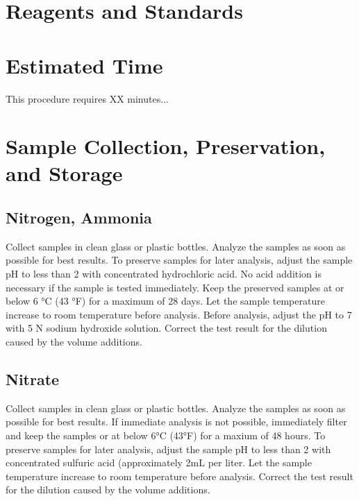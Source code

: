 \documentclass[12pt]{../SOP4_alpha}\usepackage[]{graphicx}\usepackage[]{xcolor}
\begin{document}
\section{Reagents and Standards}

\section{Estimated Time}

\NP This procedure requires XX minutes...

\section{Sample Collection, Preservation, and Storage}
\subsection{Nitrogen, Ammonia}
\NP Collect samples in clean glass or plastic bottles.
\NP Analyze the samples as soon as possible for best results.
\NP To preserve samples for later analysis, adjust the sample pH to less than 2 with concentrated hydrochloric acid. No acid addition is necessary if the sample is tested immediately.
\NP Keep the preserved samples at or below 6 °C (43 °F) for a maximum of 28 days.
\NP Let the sample temperature increase to room temperature before analysis.
\NP Before analysis, adjust the pH to 7 with 5 N sodium hydroxide solution.
\NP Correct the test result for the dilution caused by the volume additions.
\subsection {Nitrate}
\NP Collect samples in clean glass or plastic bottles.
\NP Analyze the samples as soon as possible for best results.
\NP If immediate analysis is not possible, immediately filter and keep the samples or at below 6°C (43°F) for a maxium of 48 hours.
\NP To preserve samples for later analysis, adjust the sample pH to less than 2 with concentrated sulfuric acid (approximately 2mL per liter. 
\NP Let the sample temperature increase to room temperature before analysis.
\NP Correct the test result for the dilution caused by the volume additions.
\end{document}
